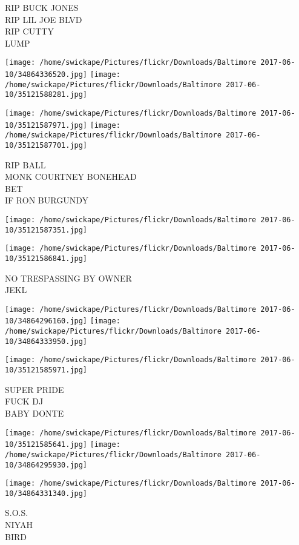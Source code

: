 \documentclass[10pt,letterpaper]{article}
\begin{document}
RIP BUCK JONES\\
RIP LIL JOE BLVD\\
RIP CUTTY\\
LUMP
\pagebreak

\texttt{[image: /home/swickape/Pictures/flickr/Downloads/Baltimore 2017-06-10/34864336520.jpg]}
\texttt{[image: /home/swickape/Pictures/flickr/Downloads/Baltimore 2017-06-10/35121588281.jpg]}

\texttt{[image: /home/swickape/Pictures/flickr/Downloads/Baltimore 2017-06-10/35121587971.jpg]}
\texttt{[image: /home/swickape/Pictures/flickr/Downloads/Baltimore 2017-06-10/35121587701.jpg]}

RIP BALL\\
MONK COURTNEY BONEHEAD\\
BET\\
IF RON BURGUNDY
\pagebreak

\texttt{[image: /home/swickape/Pictures/flickr/Downloads/Baltimore 2017-06-10/35121587351.jpg]}

\vspace{0.25in}
\texttt{[image: /home/swickape/Pictures/flickr/Downloads/Baltimore 2017-06-10/35121586841.jpg]}

NO TRESPASSING BY OWNER\\
JEKL
\pagebreak

\texttt{[image: /home/swickape/Pictures/flickr/Downloads/Baltimore 2017-06-10/34864296160.jpg]}
\texttt{[image: /home/swickape/Pictures/flickr/Downloads/Baltimore 2017-06-10/34864333950.jpg]}

\vspace{0.25in}
\texttt{[image: /home/swickape/Pictures/flickr/Downloads/Baltimore 2017-06-10/35121585971.jpg]}

SUPER PRIDE\\
FUCK DJ\\
BABY DONTE
\pagebreak

\texttt{[image: /home/swickape/Pictures/flickr/Downloads/Baltimore 2017-06-10/35121585641.jpg]}
\texttt{[image: /home/swickape/Pictures/flickr/Downloads/Baltimore 2017-06-10/34864295930.jpg]}

\vspace{0.25in}
\texttt{[image: /home/swickape/Pictures/flickr/Downloads/Baltimore 2017-06-10/34864331340.jpg]}

S.O.S.\\
NIYAH\\
BIRD
\pagebreak
\end{document}
